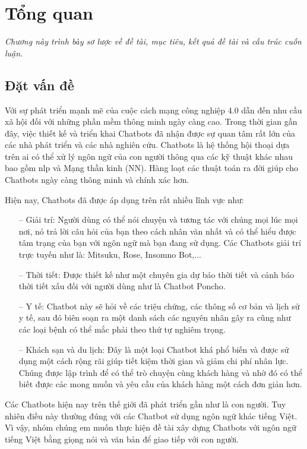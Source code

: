 \chapter{Tổng quan}
\label{Chapter1}

\emph{Chương này trình bày sơ lược về đề tài, mục tiêu, kết quả đề tài và cấu trúc cuốn luận.}

\section{Đặt vấn đề}

Với sự phát triển mạnh mẽ của cuộc cách mạng công nghiệp 4.0 dẫn đến nhu cầu xã hội đối với những phần mềm thông minh ngày càng cao. Trong thời gian gần đây, việc thiết kế và triển khai Chatbots đã nhận được sự quan tâm rất lớn của các nhà phát triển và các nhà nghiên cứu. Chatbots là hệ thống hội thoại dựa trên \ac{ai} có thể xử lý ngôn ngữ của con người thông qua các kỹ thuật khác nhau bao gồm \ac{nlp} và Mạng thần kinh (NN). Hàng loạt các thuật toán ra đời giúp cho Chatbots ngày càng thông minh và chính xác hơn.

Hiện nay, Chatbots đã được áp dụng trên rất nhiều lĩnh vực như:
\begin{itemize}
    \item[--] Giải trí: Người dùng có thể nói chuyện và tương tác với chúng mọi lúc mọi nơi, nó trả lời câu hỏi của bạn theo cách nhân văn nhất và có thể hiểu được tâm trạng của bạn với ngôn ngữ mà bạn đang sử dụng. Các Chatbots giải trí trực tuyến như là: Mitsuku, Rose, Insomno Bot,...
    \item[--] Thời tiết: Được thiết kế như một chuyên gia dự báo thời tiết và cảnh báo thời tiết xấu đối với người dùng như là Chatbot Poncho.
    \item[--] Y tế: Chatbot này sẽ hỏi về các triệu chứng, các thông số cơ bản và lịch sử y tế, sau đó biên soạn ra một danh sách các nguyên nhân gây ra cũng như các loại bệnh có thể mắc phải theo thứ tự nghiêm trọng.
    \item[--] Khách sạn và du lịch: Đây là một loại Chatbot khá phổ biến và được sử dụng một cách rộng rãi giúp tiết kiệm thời gian và giảm chi phí nhân lực. Chúng được lập trình để có thể trò chuyện cùng khách hàng và nhờ đó có thể biết được các mong muốn và yêu cầu của khách hàng một cách đơn giản hơn.
\end{itemize}

Các Chatbots hiện nay trên thế giới đã phát triển gần như là con người. Tuy nhiên điều này thường đúng với các Chatbot sử dụng ngôn ngữ khác tiếng Việt. Vì vậy, nhóm chúng em muốn thực hiện đề tài xây dựng Chatbots với ngôn ngữ tiếng Việt bằng giọng nói và văn bản để giao tiếp với con người.

